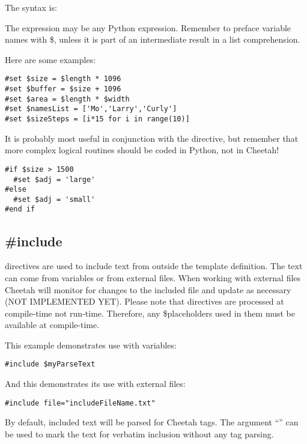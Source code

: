 The syntax is: 

The expression may be any Python expression. Remember to preface variable names
with \$, unless it is part of an intermediate result in a list comprehension.

Here are some examples:
\begin{verbatim}
#set $size = $length * 1096
#set $buffer = $size + 1096
#set $area = $length * $width
#set $namesList = ['Mo','Larry','Curly']
#set $sizeSteps = [i*15 for i in range(10)]
\end{verbatim}

It is probably most useful in conjunction with the  directive, but
remember that more complex logical routines should be coded in Python, not in
Cheetah!
\begin{verbatim}
#if $size > 1500
  #set $adj = 'large'
#else
  #set $adj = 'small'
#end if
\end{verbatim}


\subsection{\#include}
\label{directives.include}

 directives are used to include text from outside the template
definition.  The text can come from  variables or from
external files.  When working with external files Cheetah will monitor for
changes to the included file and update as necessary (NOT IMPLEMENTED YET).
Please note that  directives are processed at compile-time not
run-time.  Therefore, any \$placeholders used in them must be available at
compile-time.

This example demonstrates use with  variables:

\begin{verbatim}
#include $myParseText
\end{verbatim}

And this demonstrates its use with external files:
\begin{verbatim}
#include file="includeFileName.txt"
\end{verbatim}

By default, included text will be parsed for Cheetah tags.  The argument
``'' can be used to mark the text for verbatim inclusion without any tag
parsing.

